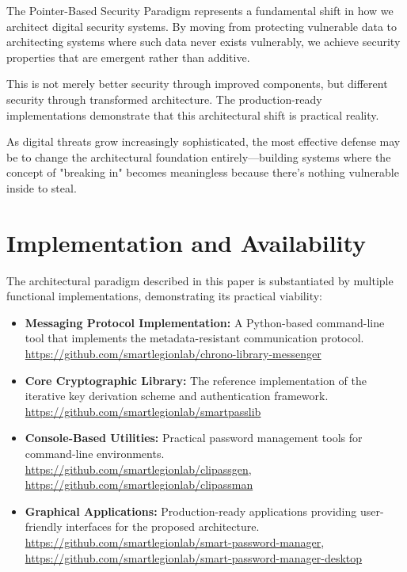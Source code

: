 \documentclass[11pt,a4paper]{article}
\begin{document}
The Pointer-Based Security Paradigm represents a fundamental shift in how we architect digital security systems. By moving from protecting vulnerable data to architecting systems where such data never exists vulnerably, we achieve security properties that are emergent rather than additive.

This is not merely better security through improved components, but different security through transformed architecture. The production-ready implementations demonstrate that this architectural shift is practical reality.

As digital threats grow increasingly sophisticated, the most effective defense may be to change the architectural foundation entirely—building systems where the concept of "breaking in" becomes meaningless because there's nothing vulnerable inside to steal.

\section*{Implementation and Availability}
The architectural paradigm described in this paper is substantiated by multiple functional implementations, demonstrating its practical viability:

\begin{itemize}
    \item \textbf{Messaging Protocol Implementation:} A Python-based command-line tool that implements the metadata-resistant communication protocol.\\
    \url{https://github.com/smartlegionlab/chrono-library-messenger}
    
    \item \textbf{Core Cryptographic Library:} The reference implementation of the iterative key derivation scheme and authentication framework.\\
    \url{https://github.com/smartlegionlab/smartpasslib}
    
    \item \textbf{Console-Based Utilities:} Practical password management tools for command-line environments.\\
    \url{https://github.com/smartlegionlab/clipassgen}, 
    \url{https://github.com/smartlegionlab/clipassman}
    
    \item \textbf{Graphical Applications:} Production-ready applications providing user-friendly interfaces for the proposed architecture.\\
    \url{https://github.com/smartlegionlab/smart-password-manager},
    \url{https://github.com/smartlegionlab/smart-password-manager-desktop}
\end{itemize}
\end{document}
